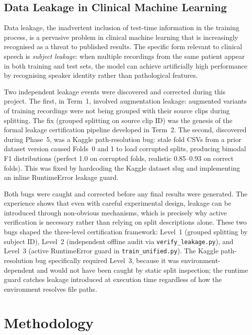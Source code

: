 \documentclass[oneside,openany]{final_report}
\begin{document}
\section{Data Leakage in Clinical Machine Learning}

Data leakage, the inadvertent inclusion of test-time information in the training process, is a pervasive problem in clinical machine learning that is increasingly recognised as a threat to published results. The specific form relevant to clinical speech is \emph{subject leakage}: when multiple recordings from the same patient appear in both training and test sets, the model can achieve artificially high performance by recognising speaker identity rather than pathological features.

Two independent leakage events were discovered and corrected during this project. The first, in Term~1, involved augmentation leakage: augmented variants of training recordings were not being grouped with their source clips during splitting. The fix (grouped splitting on source clip ID) was the genesis of the formal leakage certification pipeline developed in Term~2. The second, discovered during Phase~5, was a Kaggle path-resolution bug: stale fold CSVs from a prior dataset version caused Folds~0 and 1 to load corrupted splits, producing bimodal F1 distributions (perfect 1.0 on corrupted folds, realistic 0.85--0.93 on correct folds). This was fixed by hardcoding the Kaggle dataset slug and implementing an inline RuntimeError leakage guard.

Both bugs were caught and corrected before any final results were generated. The experience shows that even with careful experimental design, leakage can be introduced through non-obvious mechanisms, which is precisely why active verification is necessary rather than relying on split descriptions alone. These two bugs shaped the three-level certification framework: Level~1 (grouped splitting by subject ID), Level~2 (independent offline audit via \texttt{verify\_leakage.py}), and Level~3 (active RuntimeError guard in \texttt{train\_unified.py}). The Kaggle path-resolution bug specifically required Level~3, because it was environment-dependent and would not have been caught by static split inspection; the runtime guard catches leakage introduced at execution time regardless of how the environment resolves file paths.

\chapter{Methodology}
\end{document}
